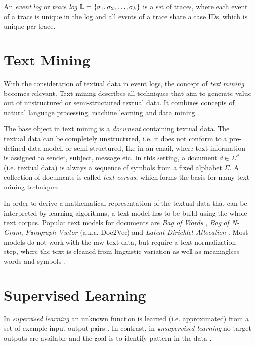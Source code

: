 \begin{definition}
	An \textit{event log} or \textit{trace log} $\mathbb{L} = \{ \sigma_1, \sigma _2, \dots, \sigma_k \}$ is a set of traces, where each event of a trace is unique in the log and all events of a trace share a case IDs, which is unique per trace.
\end{definition}

\section{Text Mining}

With the consideration of textual data in event logs, the concept of \textit{text mining} becomes relevant.
Text mining describes all techniques that aim to generate value out of unstructured or semi-structured textual data.
It combines concepts of natural language processing, machine learning and data mining \cite{DBLP:journals/coling/Mihalcea08}.

The base object in text mining is a \textit{document} containing textual data.
The textual data can be completely unstructured, i.e. it does not conform to a pre-defined data model, or semi-structured, like in an email, where text information is assigned to sender, subject, message etc.
In this setting, a document $d \in \Sigma^*$ (i.e. textual data) is always a sequence of symbols from a fixed alphabet $\Sigma$.
A collection of documents is called \textit{text corpus}, which forms the basis for many text mining techniques.

In order to derive a mathematical representation of the textual data that can be interpreted by learning algorithms, a text model has to be build using the whole text corpus.
Popular text models for documents are \textit{Bag of Words} \cite{harris1954distributional}, \textit{Bag of N-Gram}, \textit{Paragraph Vector} (a.k.a. Doc2Vec) \cite{DBLP:conf/icml/LeM14} and \textit{Latent Dirichlet Allocation} \cite{DBLP:journals/jmlr/BleiNJ03}.
Most models do not work with the raw text data, but require a text normalization step, where the text is cleaned from linguistic variation as well as meaningless words and symbols \cite{DBLP:books/lib/JurafskyM09}.

\section{Supervised Learning}

In \textit{supervised learning} an unknown function is learned (i.e. approximated) from a set of example input-output pairs \cite{DBLP:books/daglib/0023820}.
In contrast, in \textit{unsupervised learning} no target outputs are available and the goal is to identify pattern in the data \cite{DBLP:conf/ac/Ghahramani03}.

